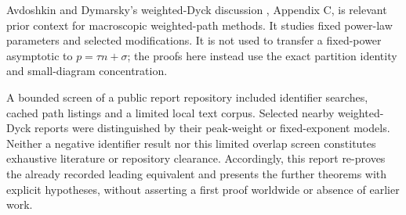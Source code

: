 \documentclass[11pt,letterpaper]{article}
\numberwithin{equation}{section}
\theoremstyle{remark}\newtheorem{remark}[theorem]{Remark}
\begin{document}
Avdoshkin and Dymarsky's weighted-Dyck discussion \cite{avdoshkin}, Appendix C, is relevant prior context for macroscopic weighted-path methods. It studies fixed power-law parameters and selected modifications. It is not used to transfer a fixed-power asymptotic to $p=\tau n+\sigma$; the proofs here instead use the exact partition identity and small-diagram concentration.

A bounded screen of a public report repository \cite{proveit} included identifier searches, cached path listings and a limited local text corpus. Selected nearby weighted-Dyck reports were distinguished by their peak-weight or fixed-exponent models. Neither a negative identifier result nor this limited overlap screen constitutes exhaustive literature or repository clearance. Accordingly, this report re-proves the already recorded leading equivalent and presents the further theorems with explicit hypotheses, without asserting a first proof worldwide or absence of earlier work.

\clearpage
\end{document}
